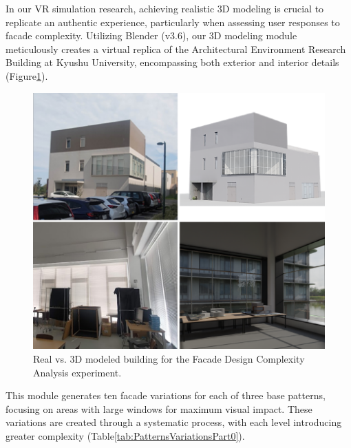 %    


In our VR simulation research, achieving realistic 3D modeling is crucial to replicate an authentic experience, particularly when assessing user responses to facade complexity.
Utilizing Blender (v3.6), our 3D modeling module meticulously creates a virtual replica of the Architectural Environment Research Building at Kyushu University, encompassing both exterior and interior details (Figure\ref{fig:RealVs3dModel}).

    \begin{figure}[htb]
    \centering
    \includegraphics[width= \linewidth]{Images/Realvs3DmodelBlender}
    \caption{Real vs. 3D modeled building for the Facade Design Complexity Analysis experiment.}
    \label{fig:RealVs3dModel}
    \end{figure}

This module generates ten facade variations for each of three base patterns, focusing on areas with large windows for maximum visual impact.
These variations are created through a systematic process, with each level introducing greater complexity (Table\ref{tab:PatternsVariationsPart0}).


